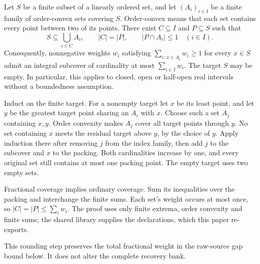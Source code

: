 \begin{lemma}\label{lem:interval-rounding}
Let $S$ be a finite subset of a linearly ordered set, and let
$(A_i)_{i\in I}$ be a finite family of order-convex sets covering $S$.
Order-convex means that each set contains every point between two of
its points. There exist $C\subseteq I$ and $P\subseteq S$ such that
\[
 S\subseteq\bigcup_{i\in C}A_i,\qquad |C|=|P|,\qquad
 |P\cap A_i|\le1\quad(i\in I).
\]
Consequently, nonnegative weights $w_i$ satisfying
$\sum_{i:\,x\in A_i}w_i\ge1$ for every $x\in S$ admit an integral
subcover of cardinality at most $\sum_{i\in I}w_i$.
The target $S$ may be empty. In particular, this applies to closed,
open or half-open real intervals without a boundedness assumption.
\end{lemma}
\begin{outline}
Induct on the finite target. For a nonempty target let $x$ be its
least point, and let $y$ be the greatest target point sharing an
$A_i$ with $x$. Choose such a set $A_j$ containing $x,y$. Order
convexity makes $A_j$ cover all target points through $y$. No set
containing $x$ meets the residual target above $y$, by the choice of
$y$. Apply induction there after removing $j$ from the index family,
then add $j$ to the subcover and $x$ to the packing. Both cardinalities
increase by one, and every original set still contains at most one
packing point. The empty target uses two empty sets.

Fractional coverage implies ordinary coverage. Sum its inequalities
over the packing and interchange the finite sums. Each set's weight
occurs at most once, so $|C|=|P|\le\sum_iw_i$. The proof uses only
finite extrema, order convexity and finite sums; the shared library
supplies the declarations, which this paper re-exports.
\end{outline}
This rounding step preserves the total fractional weight in the
raw-source gap bound below. It does not alter the complete recovery bank.

